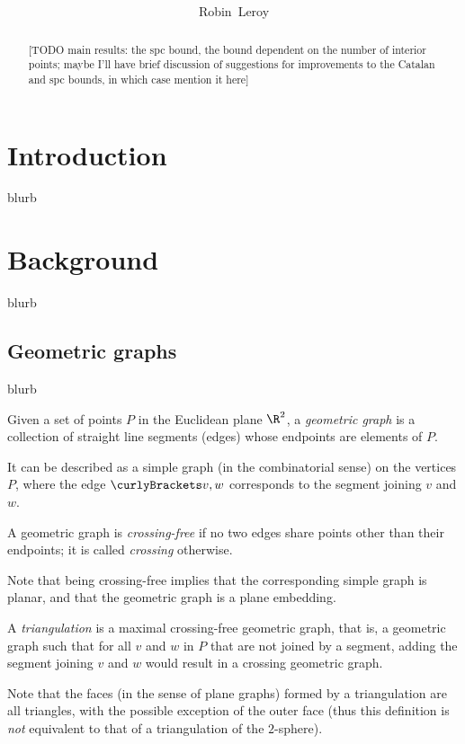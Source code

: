 \documentclass[10pt, a4paper, twoside]{basestyle}
\title{%
\textdisplay{%
Crossing-Free Perfect Matchings%
}%
}
\author{Robin~Leroy}
\begin{document}
\maketitle
\begin{abstract}
[TODO main results: the spc bound, the bound dependent on the number of interior points;
maybe I'll have brief discussion of suggestions for improvements to the Catalan and spc
bounds, in which case mention it here]
\end{abstract}

\section*{Introduction}
blurb

\section{Background}
blurb
\subsection{Geometric graphs}
blurb
\begin{definition}
Given a set of points $P$ in the Euclidean plane $\R^2$,
a \emph{geometric graph} is a collection of straight line segments (edges)
whose endpoints are elements of $P$.

It can be described as a simple graph (in the combinatorial sense)
on the vertices $P$, where the edge $\set{v,w}$ corresponds to the segment joining
$v$ and $w$.
\end{definition}
\begin{definition}
A geometric graph is \emph{crossing-free} if no two edges share points other than
their endpoints; it is called \emph{crossing} otherwise.

Note that being crossing-free implies that the corresponding simple graph is planar, and that the
geometric graph is a plane embedding.
\end{definition}
\begin{definition}[triangulation]
A \emph{triangulation} is a maximal crossing-free geometric graph, that is, a
geometric graph such that for all $v$ and $w$ in $P$ that are not joined by a
segment, adding the segment joining $v$ and $w$ would result in a crossing
geometric graph.

Note that the faces (in the sense of plane graphs) formed by a triangulation are
all triangles, with the possible exception of the outer face (thus this definition
is \emph{not} equivalent to that of a triangulation of the $2$-sphere).
\end{definition}
\end{document}
